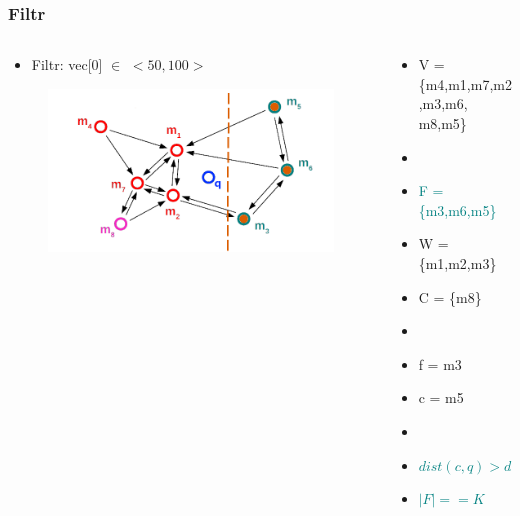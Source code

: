 \documentclass{beamer}
\begin{document}
	\begin{frame}
		\frametitle{Filtr}
		\begin{columns}[T] %
			\begin{column}{.6\textwidth}
				\begin{itemize}
					\item[] Filtr: vec[0] $\in$ $<50,100>$
				\end{itemize}
				\begin{figure}
					\includegraphics[scale=0.3]{figures/Filtry_b7.png}
				\end{figure}
			\end{column}%
			\hfill%
			\begin{column}{.4\textwidth}
				\begin{itemize}
					\item V = \{m4,m1,m7,m2,m3,m6, m8,m5\}
					\item[]
					\item \textcolor{teal}{F = \{m3,m6,m5\}}
					\item W = \{m1,m2,m3\}
					\item C = \{m8\}
					\item[]
					\item f = m3
					\item c = m5
					\item[]
					\item \textcolor{teal}{$dist(c,q) > dist(f,q)$}
					\item \textcolor{teal}{$|F| == K$}
				\end{itemize}
			\end{column}%
		\end{columns}
	\end{frame}
\end{document}
